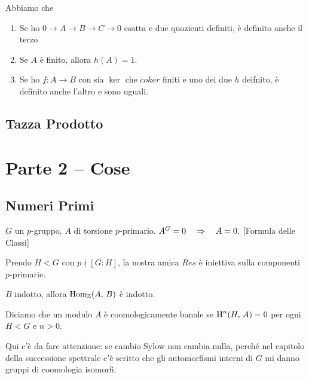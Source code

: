 \documentclass[a4paper]{article}
\begin{document}
	\begin{theorem}
		Abbiamo che
		\begin{enumerate}
			\item Se ho $ 0 \to A \to B \to C \to 0 $ esatta e due quozienti definiti, è definito anche il terzo
			\item Se $ A $ è finito, allora $ h(A) = 1 $.
			\item Se ho $ f \colon A \to B $ con sia $ \ker $ che $ coker$ finiti e uno dei due $ h $ deifnito, è definito anche l'altro e sono uguali.
		\end{enumerate}
	\end{theorem}

	\subsection{Tazza Prodotto}
	
	\newpage
	\section{ Parte 2 -- Cose}
	
	\subsection{Numeri Primi}
	\begin{lemma}
		$ G $ un $ p $-gruppo, $ A $ di torsione $ p $-primario. $ A^G = 0 \quad\Rightarrow\quad A = 0. $ [Formula delle Classi]
	\end{lemma}
	
	\begin{lemma}
		Prendo $ H < G $ con $ p \nmid [G \colon H ] $, la nostra amica $ Res $ è iniettiva sulla componenti $ p $-primarie.
	\end{lemma}

	\begin{lemma}
		$ B $ indotto, allora $ \operatorname{Hom}_{\mathbb{Z}}(A, \, B) $ è indotto.
	\end{lemma}
	
	\begin{definition}
		Diciamo che un modulo $ A $ è coomologicamente banale se $ \operatorname{H}^n(H, \, A) = 0 $ per ogni $ H < G $ e $ n > 0. $
	\end{definition}

	Qui c'è da fare attenzione: se cambio Sylow non cambia nulla, perché nel capitolo della successione spettrale c'è scritto che gli automorfismi interni di $ G $ mi danno gruppi di coomologia isomorfi.
	
\end{document}
